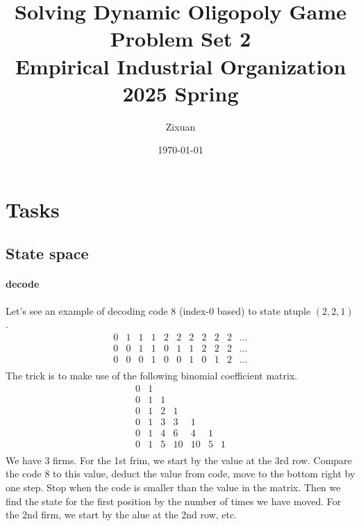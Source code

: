 \documentclass[12pt]{article}[margin=1in]
\title{\textbf{Solving Dynamic Oligopoly Game} \\
    \vspace{.3cm}
    \large Problem Set 2 \\
    Empirical Industrial Organization 2025 Spring}
\author{Zixuan}
\date{\today}
\begin{document}
\maketitle

\setcounter{page}{1}

\section{Tasks}
\subsection{State space}
\paragraph{decode}Let's see an example of decoding code 8 (index-0 based) to state ntuple $(2,2,1)$.
\begin{equation*}
    \begin{array}{cccccccccccc}
        0 & 1 & 1 & 1 & 2 & 2 & 2 & 2 & 2 & 2 & \ldots \\
        0 & 0 & 1 & 1 & 0 & 1 & 1 & 2 & 2 & 2 & \ldots \\
        0 & 0 & 0 & 1 & 0 & 0 & 1 & 0 & 1 & 2 & \ldots \\
    \end{array}
\end{equation*}
The trick is to make use of the following binomial coefficient matrix.
\begin{equation*}
    \begin{array}{ccccccc}
        0 & 1 &   &    &            \\
        0 & 1 & 1 &    &            \\
        0 & 1 & 2 & 1  &            \\
        0 & 1 & 3 & 3  & 1          \\
        0 & 1 & 4 & 6  & 4  & 1     \\
        0 & 1 & 5 & 10 & 10 & 5 & 1 \\
    \end{array}
\end{equation*}
We have 3 firms. For the 1st frim, we start by the value at the 3rd row. Compare the code 8 to this value, deduct the value from code, move to the bottom right by one step. Stop when the code is smaller than the value in the matrix. Then we find the state for the first position by the number of times we have moved. For the 2nd firm, we start by the alue at the 2nd row, etc.
\end{document}
